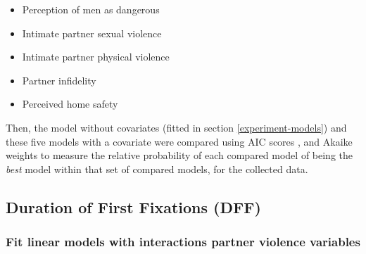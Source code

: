 \documentclass[
  bookmarksnumbered]{article}
\providecommand{\tightlist}{%
  \setlength{\itemsep}{0pt}\setlength{\parskip}{0pt}}
\begin{document}
\begin{itemize}
\tightlist
\item
  Perception of men as dangerous
\item
  Intimate partner sexual violence
\item
  Intimate partner physical violence
\item
  Partner infidelity
\item
  Perceived home safety
\end{itemize}

Then, the model without covariates (fitted in section \ref{experiment-models}) and these five models with a covariate were compared using AIC scores \autocite{akaikeInformationTheoryExtension1998,akaikeNewLookStatistical1974}, and Akaike weights \autocites[see e.g.,][]{wagenmakersAICModelSelection2004,portetPrimerModelSelection2020} to measure the relative probability of each compared model of being the \emph{best} model within that set of compared models, for the collected data.

\subsection{Duration of First Fixations (DFF)}\label{duration-of-first-fixations-dff-1}

\subsubsection{Fit linear models with interactions partner violence variables}\label{fit-linear-models-with-interactions-partner-violence-variables}
\end{document}
